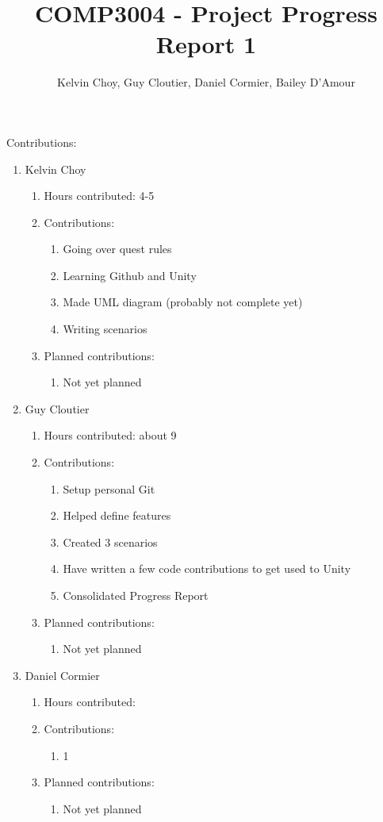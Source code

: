 \documentclass[11pt]{article}
\title{COMP3004 - Project Progress Report 1}
\author{Kelvin Choy, Guy Cloutier, Daniel Cormier, Bailey D'Amour}
\date{}
\begin{document}
\maketitle

Contributions:
\begin{enumerate}
\item Kelvin Choy
\begin{enumerate}
\item Hours contributed: 4-5
\item Contributions:
\begin{enumerate}
\item Going over quest rules
\item Learning Github and Unity
\item Made UML diagram (probably not complete yet)
\item Writing scenarios
\end{enumerate}
\item Planned contributions:
\begin{enumerate}
\item Not yet planned
\end{enumerate}
\end{enumerate}

\item Guy Cloutier
\begin{enumerate}
\item Hours contributed: about 9
\item Contributions:
\begin{enumerate}
\item Setup personal Git
\item Helped define features
\item Created 3 scenarios
\item Have written a few code contributions to get used to Unity
\item Consolidated Progress Report
\end{enumerate}
\item Planned contributions:
\begin{enumerate}
\item Not yet planned
\end{enumerate}
\end{enumerate}

\item Daniel Cormier
\begin{enumerate}
\item Hours contributed:
\item Contributions:
\begin{enumerate}
\item 1
\end{enumerate}
\item Planned contributions:
\begin{enumerate}
\item Not yet planned
\end{enumerate}
\end{enumerate}


\end{enumerate}
\end{document}
